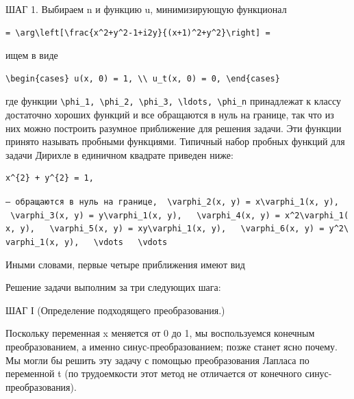 \documentclass[
  ukrainian,
]{article}
\begin{document}
ШАГ 1. Выбираем n и функцию u, минимизирующую функционал

\begin{verbatim}
= \arg\left[\frac{x^2+y^2-1+i2y}{(x+1)^2+y^2}\right] =
\end{verbatim}

ищем в виде

\begin{verbatim}
\begin{cases} u(x, 0) = 1, \\ u_t(x, 0) = 0, \end{cases}
\end{verbatim}

где функции
\texttt{\textbackslash{}phi\_1,\ \textbackslash{}phi\_2,\ \textbackslash{}phi\_3,\ \textbackslash{}ldots,\ \textbackslash{}phi\_n}
принадлежат к классу достаточно хороших функций и все обращаются в нуль
на границе, так что из них можно построить разумное приближение для
решения задачи. Эти функции принято называть пробными функциями.
Типичный набор пробных функций для задачи Дирихле в единичном квадрате
приведен ниже:

\begin{verbatim}
x^{2} + y^{2} = 1,
\end{verbatim}

\texttt{—\ обращаются\ в\ нуль\ на\ границе,\ \ \textquotesingle{}\textbackslash{}varphi\_2(x,\ y)\ =\ x\textbackslash{}varphi\_1(x,\ y),\textquotesingle{}\ \ \ \textquotesingle{}\textbackslash{}varphi\_3(x,\ y)\ =\ y\textbackslash{}varphi\_1(x,\ y),\textquotesingle{}\ \ \ \textquotesingle{}\textbackslash{}varphi\_4(x,\ y)\ =\ x\^{}2\textbackslash{}varphi\_1(x,\ y),\textquotesingle{}\ \ \ \textquotesingle{}\textbackslash{}varphi\_5(x,\ y)\ =\ xy\textbackslash{}varphi\_1(x,\ y),\textquotesingle{}\ \ \ \textquotesingle{}\textbackslash{}varphi\_6(x,\ y)\ =\ y\^{}2\textbackslash{}varphi\_1(x,\ y),\textquotesingle{}\ \ \ \textquotesingle{}\textbackslash{}vdots\textquotesingle{}\ \ \ \textquotesingle{}\textbackslash{}vdots\textquotesingle{}}

Иными словами, первые четыре приближения имеют вид

Решение задачи выполним за три следующих шага:

ШАГ І (Определение подходящего преобразования.)

Поскольку переменная x меняется от 0 до 1, мы воспользуемся конечным
преобразованием, а именно синус-преобразованием; позже станет ясно
почему. Мы могли бы решить эту задачу с помощью преобразования Лапласа
по переменной t (по трудоемкости этот метод не отличается от конечного
синус-преобразования).
\end{document}
